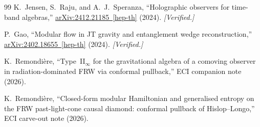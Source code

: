 \documentclass[11pt,a4paper]{article}
\theoremstyle{remark}
\begin{document}
\begin{thebibliography}{99}
K.~Jensen, S.~Raju, and A.~J.~Speranza,
``Holographic observers for time-band algebras,''
\href{https://arxiv.org/abs/2412.21185}{arXiv:2412.21185~[hep-th]} (2024).
\textit{[Verified.]}

P.~Gao,
``Modular flow in JT gravity and entanglement wedge reconstruction,''
\href{https://arxiv.org/abs/2402.18655}{arXiv:2402.18655~[hep-th]} (2024).
\textit{[Verified.]}

K.~Remondi\`ere,
``Type~II$_\infty$ for the gravitational algebra of a comoving observer
in radiation-dominated FRW via conformal pullback,''
ECI companion note (2026).

K.~Remondi\`ere,
``Closed-form modular Hamiltonian and generalised entropy on the FRW
past-light-cone causal diamond: conformal pullback of Hislop--Longo,''
ECI carve-out note (2026).

\end{thebibliography}
\end{document}
